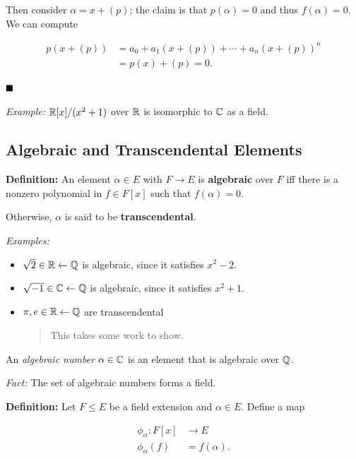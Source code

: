 Then consider \(\alpha = x + (p)\); the claim is that \(p(\alpha) = 0\)
and thus \(f(\alpha) = 0\). We can compute

\begin{align*}
p(x + (p)) &= a_0 + a_1(x + (p)) + \cdots + a_n(x + (p))^n \\
&= p(x) + (p) = 0
.\end{align*}

\(\qed\)

\emph{Example:} \({\mathbb{R}}[x] / (x^2 + 1)\) over \({\mathbb{R}}\) is isomorphic to
\({\mathbb{C}}\) as a field.

\hypertarget{algebraic-and-transcendental-elements}{%
\subsection{Algebraic and Transcendental
Elements}\label{algebraic-and-transcendental-elements}}

\textbf{Definition:} An element \(\alpha \in E\) with \(F \to E\) is
\textbf{algebraic} over \(F\) iff there is a nonzero polynomial in
\(f \in F[x]\) such that \(f(\alpha) = 0\).

Otherwise, \(\alpha\) is said to be \textbf{transcendental}.

\emph{Examples:}

\begin{itemize}
\item
  \(\sqrt 2 \in {\mathbb{R}} \leftarrow {\mathbb{Q}}\) is algebraic, since it satisfies
  \(x^2 - 2\).
\item
  \(\sqrt{-1} \in {\mathbb{C}} \leftarrow {\mathbb{Q}}\) is algebraic, since it satisfies
  \(x^2 + 1\).
\item
  \(\pi, e \in {\mathbb{R}} \leftarrow {\mathbb{Q}}\) are transcendental

  \begin{quote}
  This takes some work to show.
  \end{quote}
\end{itemize}

An \emph{algebraic number} \(\alpha \in {\mathbb{C}}\) is an element that is
algebraic over \({\mathbb{Q}}\).

\emph{Fact:} The set of algebraic numbers forms a field.

\textbf{Definition:} Let \(F \leq E\) be a field extension and
\(\alpha \in E\). Define a map

\begin{align*}
\phi_\alpha: F[x] &\to E \\
\phi_\alpha(f) &= f(\alpha)
.\end{align*}

